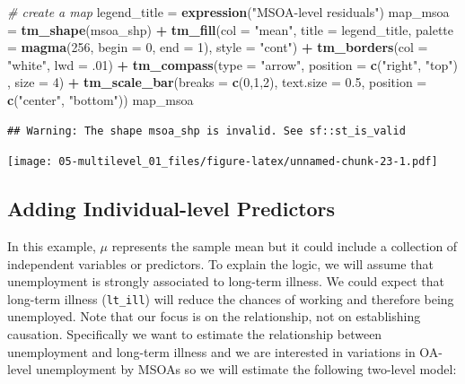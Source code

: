 \documentclass[]{book}
\newenvironment{Shaded}{\begin{snugshade}}{\end{snugshade}}
\newcommand{\KeywordTok}[1]{\textcolor[rgb]{0.13,0.29,0.53}{\textbf{#1}}}
\newcommand{\DataTypeTok}[1]{\textcolor[rgb]{0.13,0.29,0.53}{#1}}
\newcommand{\DecValTok}[1]{\textcolor[rgb]{0.00,0.00,0.81}{#1}}
\newcommand{\FloatTok}[1]{\textcolor[rgb]{0.00,0.00,0.81}{#1}}
\newcommand{\StringTok}[1]{\textcolor[rgb]{0.31,0.60,0.02}{#1}}
\newcommand{\CommentTok}[1]{\textcolor[rgb]{0.56,0.35,0.01}{\textit{#1}}}
\newcommand{\OperatorTok}[1]{\textcolor[rgb]{0.81,0.36,0.00}{\textbf{#1}}}
\newcommand{\NormalTok}[1]{#1}
\begin{document}
\begin{Shaded}
\begin{Highlighting}[]
\CommentTok{# create a map}
\NormalTok{legend_title =}\StringTok{ }\KeywordTok{expression}\NormalTok{(}\StringTok{"MSOA-level residuals"}\NormalTok{)}
\NormalTok{map_msoa =}\StringTok{ }\KeywordTok{tm_shape}\NormalTok{(msoa_shp) }\OperatorTok{+}
\StringTok{  }\KeywordTok{tm_fill}\NormalTok{(}\DataTypeTok{col =} \StringTok{"mean"}\NormalTok{, }\DataTypeTok{title =}\NormalTok{ legend_title, }\DataTypeTok{palette =} \KeywordTok{magma}\NormalTok{(}\DecValTok{256}\NormalTok{, }\DataTypeTok{begin =} \DecValTok{0}\NormalTok{, }\DataTypeTok{end =} \DecValTok{1}\NormalTok{), }\DataTypeTok{style =} \StringTok{"cont"}\NormalTok{) }\OperatorTok{+}\StringTok{ }
\StringTok{  }\KeywordTok{tm_borders}\NormalTok{(}\DataTypeTok{col =} \StringTok{"white"}\NormalTok{, }\DataTypeTok{lwd =}\NormalTok{ .}\DecValTok{01}\NormalTok{)  }\OperatorTok{+}\StringTok{ }
\StringTok{  }\KeywordTok{tm_compass}\NormalTok{(}\DataTypeTok{type =} \StringTok{"arrow"}\NormalTok{, }\DataTypeTok{position =} \KeywordTok{c}\NormalTok{(}\StringTok{"right"}\NormalTok{, }\StringTok{"top"}\NormalTok{) , }\DataTypeTok{size =} \DecValTok{4}\NormalTok{) }\OperatorTok{+}\StringTok{ }
\StringTok{  }\KeywordTok{tm_scale_bar}\NormalTok{(}\DataTypeTok{breaks =} \KeywordTok{c}\NormalTok{(}\DecValTok{0}\NormalTok{,}\DecValTok{1}\NormalTok{,}\DecValTok{2}\NormalTok{), }\DataTypeTok{text.size =} \FloatTok{0.5}\NormalTok{, }\DataTypeTok{position =}  \KeywordTok{c}\NormalTok{(}\StringTok{"center"}\NormalTok{, }\StringTok{"bottom"}\NormalTok{)) }
\NormalTok{map_msoa}
\end{Highlighting}
\end{Shaded}

\begin{verbatim}
## Warning: The shape msoa_shp is invalid. See sf::st_is_valid
\end{verbatim}

\texttt{[image: 05-multilevel\_01\_files/figure-latex/unnamed-chunk-23-1.pdf]}

\subsection{Adding Individual-level
Predictors}\label{adding-individual-level-predictors}

In this example, \(\mu\) represents the sample mean but it could include
a collection of independent variables or predictors. To explain the
logic, we will assume that unemployment is strongly associated to
long-term illness. We could expect that long-term illness
(\texttt{lt\_ill}) will reduce the chances of working and therefore
being unemployed. Note that our focus is on the relationship, not on
establishing causation. Specifically we want to estimate the
relationship between unemployment and long-term illness and we are
interested in variations in OA-level unemployment by MSOAs so we will
estimate the following two-level model:
\end{document}
